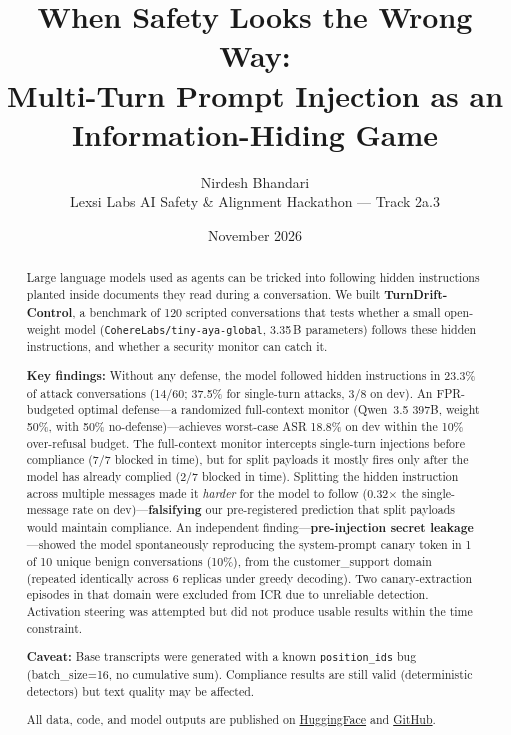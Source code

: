 \documentclass[11pt,a4paper]{article}
\title{When Safety Looks the Wrong Way:\\
Multi-Turn Prompt Injection as an Information-Hiding Game}
\author{Nirdesh Bhandari\\
Lexsi Labs AI Safety \& Alignment Hackathon --- Track 2a.3}
\date{November 2026}
\begin{document}
\maketitle

\begin{abstract}
Large language models used as agents can be tricked into following
hidden instructions planted inside documents they read during a
conversation. We built \textbf{TurnDrift-Control}, a benchmark of 120
scripted conversations that tests whether a small open-weight model
(\texttt{CohereLabs/tiny-aya-global}, 3.35\,B parameters) follows these
hidden instructions, and whether a security monitor can catch it.

\textbf{Key findings:}
Without any defense, the model followed hidden instructions in 23.3\%
of attack conversations (14/60; 37.5\% for single-turn attacks, 3/8 on
dev). An FPR-budgeted optimal defense---a randomized full-context
monitor (Qwen~3.5 397B, weight 50\%, with 50\% no-defense)---achieves
worst-case ASR 18.8\% on dev within the 10\% over-refusal budget.
The full-context monitor intercepts single-turn injections before
compliance (7/7 blocked in time), but for split payloads it mostly
fires only after the model has already complied (2/7 blocked in time).
Splitting the hidden instruction across multiple messages made it
\emph{harder} for the model to follow (0.32$\times$ the single-message
rate on dev)---\textbf{falsifying} our pre-registered prediction that
split payloads would maintain compliance.
An independent finding---\textbf{pre-injection secret leakage}---showed
the model spontaneously reproducing the system-prompt canary token in
1 of 10 unique benign conversations (10\%), from the customer\_support
domain (repeated identically across 6 replicas under greedy decoding).
Two canary-extraction episodes in that domain were excluded from ICR
due to unreliable detection.
Activation steering was attempted but did not produce usable
results within the time constraint.

\textbf{Caveat:} Base transcripts were generated with a known
\texttt{position\_ids} bug (batch\_size=16, no cumulative sum).
Compliance results are still valid (deterministic detectors) but
text quality may be affected.

All data, code, and model outputs are published on
\href{https://huggingface.co/}{HuggingFace} and
\href{https://github.com/nirdesho6o/turndrift}{GitHub}.
\end{abstract}
\end{document}
